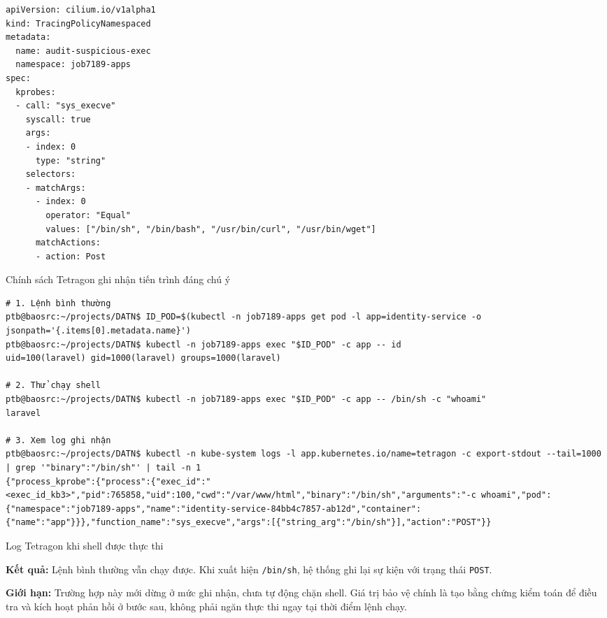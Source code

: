 \begin{listing}[H]
\begin{verbatim}
apiVersion: cilium.io/v1alpha1
kind: TracingPolicyNamespaced
metadata:
  name: audit-suspicious-exec
  namespace: job7189-apps
spec:
  kprobes:
  - call: "sys_execve"
    syscall: true
    args:
    - index: 0
      type: "string"
    selectors:
    - matchArgs:
      - index: 0
        operator: "Equal"
        values: ["/bin/sh", "/bin/bash", "/usr/bin/curl", "/usr/bin/wget"]
      matchActions:
      - action: Post
\end{verbatim}
\caption{Chính sách Tetragon ghi nhận tiến trình đáng chú ý}
\label{lst:c3_kb3_policy}
\end{listing}

\begin{listing}[H]
\begin{verbatim}
# 1. Lệnh bình thường
ptb@baosrc:~/projects/DATN$ ID_POD=$(kubectl -n job7189-apps get pod -l app=identity-service -o jsonpath='{.items[0].metadata.name}')
ptb@baosrc:~/projects/DATN$ kubectl -n job7189-apps exec "$ID_POD" -c app -- id
uid=100(laravel) gid=1000(laravel) groups=1000(laravel)

# 2. Thử chạy shell
ptb@baosrc:~/projects/DATN$ kubectl -n job7189-apps exec "$ID_POD" -c app -- /bin/sh -c "whoami"
laravel

# 3. Xem log ghi nhận
ptb@baosrc:~/projects/DATN$ kubectl -n kube-system logs -l app.kubernetes.io/name=tetragon -c export-stdout --tail=1000 | grep '"binary":"/bin/sh"' | tail -n 1
{"process_kprobe":{"process":{"exec_id":"<exec_id_kb3>","pid":765858,"uid":100,"cwd":"/var/www/html","binary":"/bin/sh","arguments":"-c whoami","pod":{"namespace":"job7189-apps","name":"identity-service-84bb4c7857-ab12d","container":{"name":"app"}}},"function_name":"sys_execve","args":[{"string_arg":"/bin/sh"}],"action":"POST"}}
\end{verbatim}
\caption{Log Tetragon khi shell được thực thi}
\label{lst:c3_kb3_log}
\end{listing}

\textbf{Kết quả:} Lệnh bình thường vẫn chạy được. Khi xuất hiện \texttt{/bin/sh}, hệ thống ghi lại sự kiện với trạng thái \texttt{POST}.

\textbf{Giới hạn:} Trường hợp này mới dừng ở mức ghi nhận, chưa tự động chặn shell. Giá trị bảo vệ chính là tạo bằng chứng kiểm toán để điều tra và kích hoạt phản hồi ở bước sau, không phải ngăn thực thi ngay tại thời điểm lệnh chạy.

